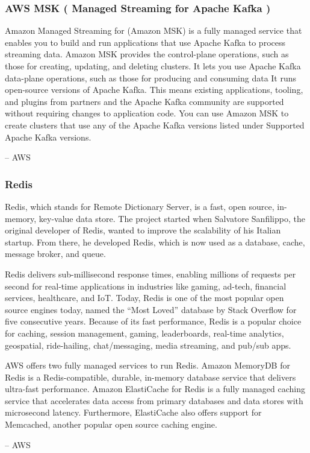 \documentclass{csse4400}
\begin{document}
\subsubsection{AWS MSK ( Managed Streaming for Apache Kafka )}
\begin{oldquote}
Amazon Managed Streaming for  (Amazon MSK) is a fully managed service
that enables you to build and run applications that use Apache Kafka to process streaming data.
Amazon MSK provides the control-plane operations, such as those for creating, updating, and deleting clusters.
It lets you use Apache Kafka data-plane operations,
such as those for producing and consuming data
It runs open-source versions of Apache Kafka.
This means existing applications, tooling, and plugins from partners and the Apache Kafka community are supported without requiring changes to application code.
You can use Amazon MSK to create clusters that use any of the Apache Kafka versions listed under Supported Apache Kafka versions.

\raggedleft -- AWS
\end{oldquote}


\subsubsection{Redis}
\begin{oldquote}
Redis, which stands for Remote Dictionary Server,
is a fast, open source, in-memory, key-value data store.
The project started when Salvatore Sanfilippo,
the original developer of Redis,
wanted to improve the scalability of his Italian startup.
From there, he developed Redis,
which is now used as a database, cache, message broker, and queue.

Redis delivers sub-millisecond response times,
enabling millions of requests per second for real-time applications in industries like gaming, ad-tech, financial services, healthcare, and IoT.
Today, Redis is one of the most popular open source engines today,
named the ``Most Loved'' database by Stack Overflow for five consecutive years.
Because of its fast performance,
Redis is a popular choice for caching, session management, gaming, leaderboards, real-time analytics, geospatial, ride-hailing, chat/messaging, media streaming, and pub/sub apps.
  
AWS offers two fully managed services to run Redis.
Amazon MemoryDB for Redis is a Redis-compatible, durable, in-memory database service that delivers ultra-fast performance.
Amazon ElastiCache for Redis is a fully managed caching service that accelerates data access from primary databases and data stores with microsecond latency.
Furthermore, ElastiCache also offers support for Memcached, another popular open source caching engine.

\raggedleft -- AWS
\end{oldquote}
\end{document}
